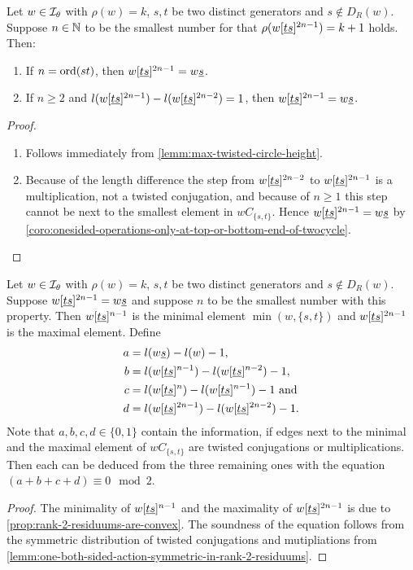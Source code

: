 \begin{lemm}
	Let $w \in \mathcal{I}_{\theta}$ with $\rho(w) = k$, $s,t$ be two distinct generators and $s \notin D_R(w)$. Suppose $n \in \mathbb{N}$ to be the smallest number for that $\rho(w[\underline{t} \underline{s}]^{2n-1}) = k + 1$ holds. Then:

	\begin{enumerate}
		\item If $n = \operatorname{ord}(st)$, then $w[\underline{t} \underline{s}]^{2n-1} = w \underline{s}$.
		\item If $n \geq 2$ and $l(w[\underline{t} \underline{s}]^{2n-1}) - l(w[\underline{t} \underline{s}]^{2n-2}) = 1$, then $w[\underline{t} \underline{s}]^{2n-1} = w \underline{s}$.
	\end{enumerate}

	\begin{proof}

		\begin{enumerate}
			\item Follows immediately from \ref{lemm:max-twisted-circle-height}.
			\item Because of the length difference the step from $w[\underline{t} \underline{s}]^{2n-2}$ to $w[\underline{t} \underline{s}]^{2n-1}$ is a multiplication, not a twisted conjugation, and because of $n \geq 1$ this step cannot be next to the smallest element in $wC_{\{s,t\}}$. Hence $w[\underline{t} \underline{s}]^{2n-1} = w \underline{s}$ by \ref{coro:onesided-operations-only-at-top-or-bottom-end-of-twocycle}.
		\end{enumerate}
	\end{proof}
\end{lemm}

\begin{lemm}
	Let $w \in \mathcal{I}_{\theta}$ with $\rho(w) = k$, $s,t$ be two distinct generators and $s \notin D_R(w)$. Suppose $w[\underline{t} \underline{s}]^{2n-1} = w \underline{s}$ and suppose $n$ to be the smallest number with this property. Then $w[\underline{t} \underline{s}]^{n-1}$ is the minimal element $\min(w,\{s,t\})$ and $w[\underline{t} \underline{s}]^{2n-1}$ is the maximal element. Define
	\begin{align*}
		a & = l(w \underline{s}) - l(w) - 1, \\
		b & = l(w[\underline{t} \underline{s}]^{n-1}) - l(w[\underline{t} \underline{s}]^{n-2}) - 1, \\
		c & = l(w[\underline{t} \underline{s}]^{n}) - l(w[\underline{t} \underline{s}]^{n-1}) - 1 \textrm{ and} \\
		d & = l(w[\underline{t} \underline{s}]^{2n-1}) - l(w[\underline{t} \underline{s}]^{2n-2}) - 1.
	\end{align*}
	Note that $a,b,c,d \in \{0,1\}$ contain the information, if edges next to the minimal and the maximal element of $wC_{\{s,t\}}$ are twisted conjugations or multiplications. Then each can be deduced from the three remaining ones with the equation $(a+b+c+d) \equiv 0 \mod 2 $.

	\begin{proof}
		The minimality of $w[\underline{t} \underline{s}]^{n-1}$ and the maximality of $w[\underline{t} \underline{s}]^{2n-1}$ is due to \ref{prop:rank-2-residuums-are-convex}. The soundness of the equation follows from the symmetric distribution of twisted conjugations and mutipliations from \ref{lemm:one-both-sided-action-symmetric-in-rank-2-residuums}.
	\end{proof}
\end{lemm}

